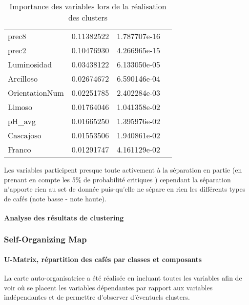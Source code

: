 \begin{table}[H]
\begin{tabular}{llll}
		prec8          & 0.11382522 & 1.787707e-16  \\
		prec2          & 0.10476930 & 4.266965e-15  \\
		Luminosidad    & 0.03438122 & 6.133050e-05  \\
		Arcilloso      & 0.02674672 & 6.590146e-04  \\
		OrientationNum & 0.02251785 & 2.402284e-03  \\
		Limoso         & 0.01764046 & 1.041358e-02  \\
		pH\_avg        & 0.01665250 & 1.395976e-02  \\
		Cascajoso      & 0.01553506 & 1.940861e-02  \\
		Franco         & 0.01291747 & 4.161129e-02 
	\end{tabular}
	\caption{Importance des variables lors de la réalisation des clusters}
\end{table}


\noindent Les variables participent presque toute activement à la séparation en partie (en prenant en compte les 5\% de probabilité critiques ) cependant la séparation n'apporte rien au set de donnée puis-qu'elle ne sépare en rien les différents types de cafés (note basse - note haute). 



\paragraph{Analyse des résultats de clustering}























\newpage
\subsubsection{Self-Organizing Map}\label{SOM}

\paragraph{U-Matrix, répartition des cafés par classes et composants} 
La carte auto-organisatrice a été réalisée en incluant toutes les variables afin de voir où se placent les variables dépendantes par rapport aux variables indépendantes et de permettre d'observer d'éventuels clusters. 


